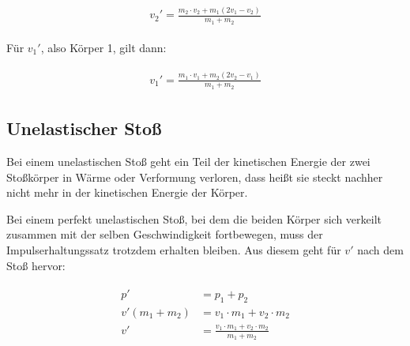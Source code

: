 \begin{align}
\begin{split}
	v_2'=\frac{m_2 \cdot v_2 + m_1(2v_1 - v_2)}{m_1 + m_2}
\end{split}
\end{align}

\noindent Für $v_1'$, also Körper 1, gilt dann:

\begin{align}
\begin{split}
	v_1'=\frac{m_1 \cdot v_1 + m_2(2v_2 - v_1)}{m_1 + m_2}
\end{split}
\end{align}


\subsection{Unelastischer Stoß}

Bei einem unelastischen Stoß geht ein Teil der kinetischen Energie der zwei Stoßkörper in Wärme oder Verformung \glqq verloren\grqq , dass heißt sie steckt nachher nicht mehr in der kinetischen Energie der Körper. 

Bei einem perfekt unelastischen Stoß, bei dem die beiden Körper sich \glqq verkeilt\grqq{} zusammen mit der selben Geschwindigkeit fortbewegen, muss der Impulserhaltungssatz trotzdem erhalten bleiben. Aus diesem geht für $v'$ nach dem Stoß hervor:

\begin{align}
\begin{split}
	p' &= p_1 + p_2 \\
	v'(m_1 + m_2) &= v_1 \cdot m_1 + v_2 \cdot m_2 \\
	v' &= \frac{v_1 \cdot m_1 + v_2 \cdot m_2}{m_1 + m_2}
\end{split}
\end{align}

